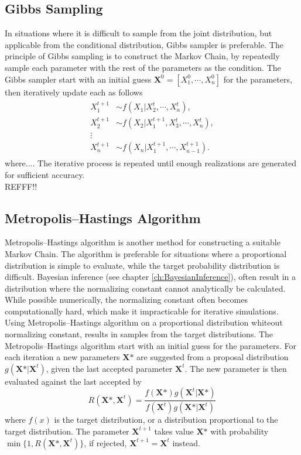 \subsection{Gibbs Sampling}
In situations where it is difficult to sample from the joint distribution, but applicable from the conditional distribution, Gibbs sampler is preferable. The principle of Gibbs sampling is to construct the Markov Chain, by repeatedly sample each parameter with the rest of the parameters as the condition. The Gibbs sampler start with an initial guess $\boldsymbol{X}^{0}=[X_1^0,\cdots, X_n^0]$ for the parameters, then iteratively update each as follows
\begin{align}
\label{eq:gibbs}
\begin{split}
    X_1^{t+1}& \sim f(X_1|X_2^{t},\cdots,X_n^{t}),\\
    X_2^{t+1}& \sim f(X_2|X_1^{t+1},X_3^{t},\cdots,X_n^{t}),\\
    \vdots \\
    X_n^{t+1}& \sim f(X_n|X_1^{t+1},\cdots,X_{n-1}^{t+1}).
\end{split}
\end{align}
where....
The iterative process is repeated until enough realizations are generated for sufficient accuracy.\\
REFFF!!

\subsection{Metropolis–Hastings Algorithm}
Metropolis–Hastings algorithm is another method for constructing a suitable Markov Chain. The algorithm is preferable for situations where a proportional distribution is simple to evaluate, while the target probability distribution is difficult. Bayesian inference (see chapter \ref{ch:BayesianInference}), often result in a distribution where the normalizing constant cannot analytically be calculated. While possible numerically, the normalizing constant often becomes computationally hard, which make it impracticable for iterative simulations. Using Metropolis–Hastings algorithm on a proportional distribution whiteout normalizing constant, results in samples from the target distributions. The Metropolis–Hastings algorithm start with an initial guess for the parameters. For each iteration a new parameters $\boldsymbol{X} \mbox{*}$ are suggested from a proposal distribution $g(\boldsymbol{X} \mbox{*}|\boldsymbol{X}^t)$, given the last accepted parameter $\boldsymbol{X}^t$. The new parameter is then evaluated against the last accepted by
\begin{equation}
R(\boldsymbol{X} \mbox{*},\boldsymbol{X}^{t})=\frac{f(\boldsymbol{X} \mbox{*})g(\boldsymbol{X}^{t}|\boldsymbol{X} \mbox{*})}{f(\boldsymbol{X}^{t})g(\boldsymbol{X} \mbox{*}|\boldsymbol{X}^{t})}
\end{equation}
where $f(x)$ is the target distribution, or a distribution proportional to the target distribution. The parameter $\boldsymbol{X}^{t+1}$ takes value $\boldsymbol{X}\mbox{*}$ with probability $\min\{1,R(\boldsymbol{X} \mbox{*},\boldsymbol{X}^{t})\}$, if rejected, $\boldsymbol{X}^{t+1}=\boldsymbol{X}^t$ instead.

